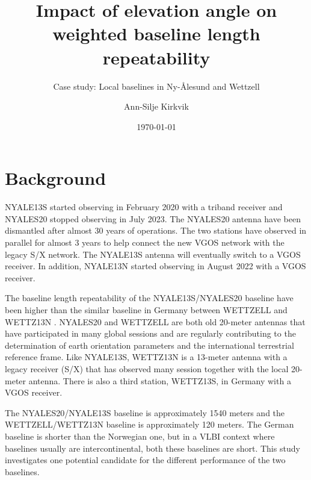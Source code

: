 \documentclass[twoside=semi,fontsize=12pt,paper=a4,titlepage=on]{kv_article}
\begin{document}
\title{Impact of elevation angle on weighted baseline length repeatability}
\subtitle{\vspace{1cm}Case study: Local baselines in Ny-Ålesund and Wettzell}
\author{Ann-Silje Kirkvik}
\date{\today}

\maketitle

\section{Background}
NYALE13S started observing in February 2020 with a triband receiver and NYALES20 stopped observing in July 2023. The NYALES20 antenna have been dismantled after almost 30 years of operations. The two stations have observed in parallel for almost 3 years to help connect the new VGOS network with the legacy S/X network. The NYALE13S antenna will eventually switch to a VGOS receiver. In addition, NYALE13N started observing in August 2022 with a VGOS receiver.

The baseline length repeatability of the NYALE13S/NYALES20 baseline have been higher than the similar baseline in Germany between WETTZELL and WETTZ13N \cite{kirkvik2021}. NYALES20 and WETTZELL are both old 20-meter antennas that have participated in many global sessions and are regularly contributing to the determination of earth orientation parameters and the international terrestrial reference frame. Like NYALE13S, WETTZ13N is a 13-meter antenna with a legacy receiver (S/X) that has observed many session together with the local 20-meter antenna. There is also a third station, WETTZ13S, in Germany with a VGOS receiver.

The NYALES20/NYALE13S baseline is approximately 1540 meters and the WETTZELL/WETTZ13N baseline is approximately 120 meters. The German baseline is shorter than the Norwegian one, but in a VLBI context where baselines usually are intercontinental, both these baselines are short. This study investigates one potential candidate for the different performance of the two baselines.
\end{document}
